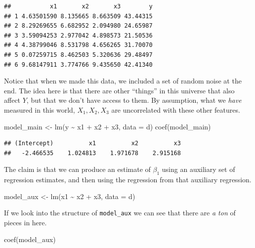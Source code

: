 \documentclass[
]{book}
\newenvironment{Shaded}{\begin{snugshade}}{\end{snugshade}}
\newcommand{\AttributeTok}[1]{\textcolor[rgb]{0.77,0.63,0.00}{#1}}
\newcommand{\FunctionTok}[1]{\textcolor[rgb]{0.00,0.00,0.00}{#1}}
\newcommand{\NormalTok}[1]{#1}
\newcommand{\OtherTok}[1]{\textcolor[rgb]{0.56,0.35,0.01}{#1}}
\newcommand{\SpecialCharTok}[1]{\textcolor[rgb]{0.00,0.00,0.00}{#1}}
\theoremstyle{definition}
\theoremstyle{definition}
\theoremstyle{definition}
\theoremstyle{definition}
\theoremstyle{remark}
\begin{document}
\begin{verbatim}
##           x1       x2       x3        y
## 1 4.63501590 8.135665 8.663509 43.44315
## 2 8.29269655 6.682952 2.094980 24.65987
## 3 3.59094253 2.977042 4.898573 21.50536
## 4 4.38799046 8.531798 4.656265 31.70070
## 5 0.07259715 8.462503 5.320636 29.48497
## 6 9.68147911 3.774766 9.435650 42.41340
\end{verbatim}

Notice that when we made this data, we included a set of random noise at the end. The idea here is that there are other ``things'' in this universe that also affect \(Y\), but that we don't have access to them. By assumption, what we \emph{have} measured in this world, \(X_1, X_2, X_3\) are uncorrelated with these other features.

\begin{Shaded}
\begin{Highlighting}[]
\NormalTok{model\_main }\OtherTok{\textless{}{-}} \FunctionTok{lm}\NormalTok{(y }\SpecialCharTok{\textasciitilde{}}\NormalTok{ x1 }\SpecialCharTok{+}\NormalTok{ x2 }\SpecialCharTok{+}\NormalTok{ x3, }\AttributeTok{data =}\NormalTok{ d)}
\FunctionTok{coef}\NormalTok{(model\_main)}
\end{Highlighting}
\end{Shaded}

\begin{verbatim}
## (Intercept)          x1          x2          x3 
##   -2.466535    1.024813    1.971678    2.915168
\end{verbatim}

The claim is that we can produce an estimate of \(\beta_1\) using an auxiliary set of regression estimates, and then using the regression from that auxiliary regression.

\begin{Shaded}
\begin{Highlighting}[]
\NormalTok{model\_aux }\OtherTok{\textless{}{-}} \FunctionTok{lm}\NormalTok{(x1 }\SpecialCharTok{\textasciitilde{}}\NormalTok{ x2 }\SpecialCharTok{+}\NormalTok{ x3, }\AttributeTok{data =}\NormalTok{ d)}
\end{Highlighting}
\end{Shaded}

If we look into the structure of \texttt{model\_aux} we can see that there are \emph{a ton} of pieces in here.

\begin{Shaded}
\begin{Highlighting}[]
\FunctionTok{coef}\NormalTok{(model\_aux)}
\end{Highlighting}
\end{Shaded}
\end{document}
